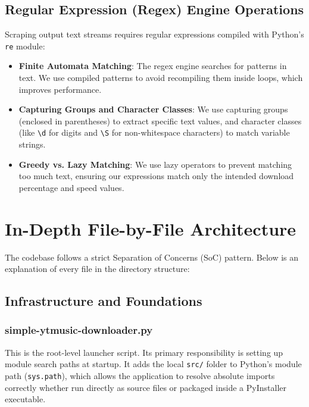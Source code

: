 \documentclass[12pt]{report}
\begin{document}
\section{Regular Expression (Regex) Engine Operations}
Scraping output text streams requires regular expressions compiled with Python's \texttt{re} module:
\begin{itemize}[leftmargin=*]
    \item \textbf{Finite Automata Matching}: The regex engine searches for patterns in text. We use compiled patterns to avoid recompiling them inside loops, which improves performance.
    \item \textbf{Capturing Groups and Character Classes}: We use capturing groups (enclosed in parentheses) to extract specific text values, and character classes (like \texttt{\textbackslash{}d} for digits and \texttt{\textbackslash{}S} for non-whitespace characters) to match variable strings.
    \item \textbf{Greedy vs. Lazy Matching}: We use lazy operators to prevent matching too much text, ensuring our expressions match only the intended download percentage and speed values.
\end{itemize}

\newpage
\chapter{In-Depth File-by-File Architecture}

The codebase follows a strict Separation of Concerns (SoC) pattern. Below is an explanation of every file in the directory structure:

\section{Infrastructure and Foundations}

\subsection{simple-ytmusic-downloader.py}
This is the root-level launcher script. Its primary responsibility is setting up module search paths at startup. It adds the local \texttt{src/} folder to Python's module path (\texttt{sys.path}), which allows the application to resolve absolute imports correctly whether run directly as source files or packaged inside a PyInstaller executable.
\end{document}
